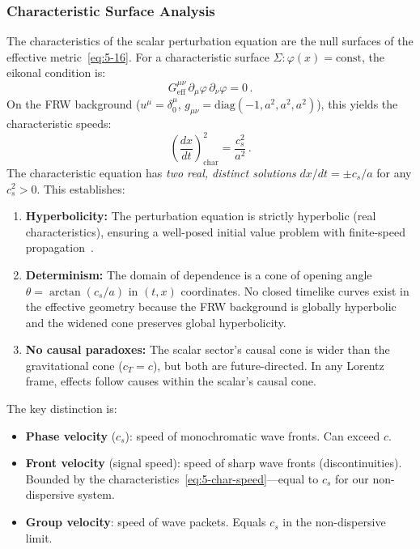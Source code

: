 \subsubsection{Characteristic Surface Analysis}

The characteristics of the scalar perturbation equation are the null surfaces of the effective metric~\eqref{eq:5-16}. For a characteristic surface $\Sigma: \varphi(x) = \mathrm{const}$, the eikonal condition is:
\begin{equation}
  G^{\mu\nu}_\mathrm{eff}\,\partial_\mu\varphi\,\partial_\nu\varphi = 0\,.
  \label{eq:5-char-eikonal}
\end{equation}
On the FRW background ($u^\mu = \delta^\mu_0$, $g_{\mu\nu} = \mathrm{diag}(-1, a^2, a^2, a^2)$), this yields the characteristic speeds:
\begin{equation}
  \left(\frac{dx}{dt}\right)_{\!\mathrm{char}}^2 = \frac{c_s^2}{a^2}\,.
  \label{eq:5-char-speed}
\end{equation}
The characteristic equation has \emph{two real, distinct solutions} $dx/dt = \pm c_s/a$ for any $c_s^2 > 0$. This establishes:
\begin{enumerate}
  \item \textbf{Hyperbolicity:} The perturbation equation is strictly hyperbolic (real characteristics), ensuring a well-posed initial value problem with finite-speed propagation~\cite{ch5:Faraoni2009}.
  \item \textbf{Determinism:} The domain of dependence is a cone of opening angle $\theta = \arctan(c_s/a)$ in $(t, x)$ coordinates. No closed timelike curves exist in the effective geometry because the FRW background is globally hyperbolic and the widened cone preserves global hyperbolicity.
  \item \textbf{No causal paradoxes:} The scalar sector's causal cone is wider than the gravitational cone ($c_T = c$), but both are future-directed. In any Lorentz frame, effects follow causes within the scalar's causal cone.
\end{enumerate}

The key distinction is:
\begin{itemize}
\item \textbf{Phase velocity} ($c_s$): speed of monochromatic wave fronts. Can exceed $c$.
\item \textbf{Front velocity} (signal speed): speed of sharp wave fronts (discontinuities). Bounded by the characteristics~\eqref{eq:5-char-speed}---equal to $c_s$ for our non-dispersive system.
\item \textbf{Group velocity}: speed of wave packets. Equals $c_s$ in the non-dispersive limit.
\end{itemize}

